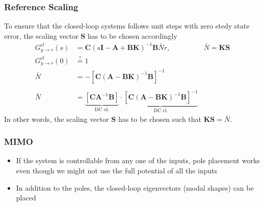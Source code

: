 \subsubsection{Reference Scaling}
To ensure that the closed-loop systems follows unit steps with zero stedy state error, the scaling vector $\mathbf{S}$ has to be chosen accordingly
\noindent\begin{align*}
    G_{y\rightarrow r}^{cl}(s) & =\mathbf{C}{(s\mathbf{I}-\mathbf{A}+\mathbf{BK})}^{-1}\mathbf{B}\bar{N}r,                                                                                                      & \bar{N}=\mathbf{KS} \\
    G_{y\rightarrow r}^{cl}(0) & \overset{!}{=} 1                                                                                                                                                                                     \\
    \bar{N}                    & =-{\left[\mathbf{C}{(\mathbf{A}-\mathbf{BK})}^{-1}\mathbf{B}\right]}^{-1}                                                                                                                            \\\\
    \bar{N}                    & =\underbrace{\left[\mathbf{CA}^{-1}\mathbf{B}\right]}_{\text{DC ol.}}\cdot\underbrace{{\left[\mathbf{C}{(\mathbf{A}-\mathbf{BK})}^{-1}\mathbf{B}\right]}^{-1}}_{\text{DC cl.}}
\end{align*}
In other words, the scaling vector $\mathbf{S}$ has to be chosen such that $\mathbf{KS}=\bar{N}$.

\subsubsection{MIMO}
\begin{itemize}
    \item If the system is controllable from any one of the inputs, pole placement works even though we might not use the full potential of all the inputs
    \item In addition to the poles, the closed-loop eigenvectors (modal shapes) can be placed
\end{itemize}
